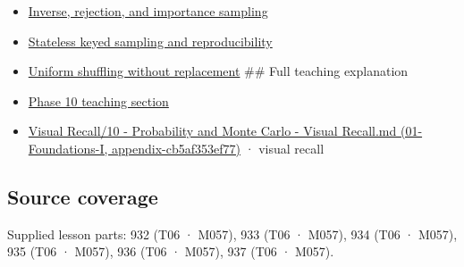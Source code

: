 \begin{itemize}
\item
  \hyperref[appendix-8d863ed954d0]{Inverse, rejection, and importance sampling}
\item
  \hyperref[appendix-daaf25bfd3a0]{Stateless keyed sampling and reproducibility}
\item
  \hyperref[appendix-184fcc411663]{Uniform shuffling without replacement} \#\# Full teaching explanation
\item
  \hyperref[02-foundations-ii-ch029-a-computer-produces-deterministic-pseudorandom-sequences]{Phase 10 teaching section}
\item
  \href{../01-Foundations-I/main.pdf\#nameddest=appendix-cb5af353ef77}{Visual Recall/10 - Probability and Monte Carlo - Visual Recall.md (01-Foundations-I, appendix-cb5af353ef77)} · visual recall
\end{itemize}

\subsection{Source coverage}\label{appendix-e0f7c7e08f3a-source-coverage}

Supplied lesson parts: 932 (T06 · M057), 933 (T06 · M057), 934 (T06 · M057), 935 (T06 · M057), 936 (T06 · M057), 937 (T06 · M057).
